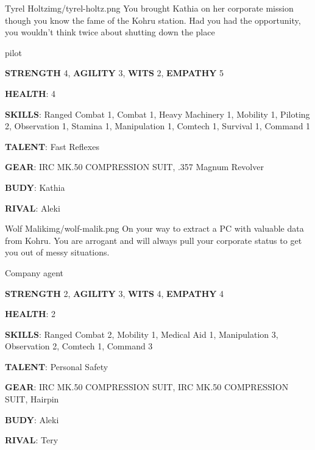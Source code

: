 \medskip \medskip \medskip \medskip \medskip \medskip \medskip \medskip \medskip \medskip \medskip \medskip 
\medskip \medskip \medskip \medskip \medskip \medskip \medskip \medskip \medskip \medskip \medskip \medskip 




\begin{rpg-pcbox}{Tyrel Holtz}{img/tyrel-holtz.png}
    You brought Kathia on her corporate mission though you know the fame of the Kohru station. Had you had the opportunity, you wouldn't think twice about shutting down the place
\end{rpg-pcbox}

\begin{rpg-commentbox}{}
    pilot

    \textbf{STRENGTH} 4, \textbf{AGILITY} 3, \textbf{WITS} 2, \textbf{EMPATHY} 5

    \textbf{HEALTH}: 4

    \textbf{SKILLS}: Ranged Combat 1, Combat 1, Heavy Machinery 1, Mobility 1, Piloting 2, Observation 1, Stamina 1, Manipulation 1, Comtech 1, Survival 1, Command 1
    
    \textbf{TALENT}: Fast Reflexes
    
    \textbf{GEAR}: IRC MK.50 COMPRESSION SUIT, .357 Magnum Revolver

    \textbf{BUDY}: Kathia
    
    \textbf{RIVAL}: Aleki
\end{rpg-commentbox}


\newsect

\clearpage


\begin{rpg-pcbox}{Wolf Malik}{img/wolf-malik.png}
    On your way to extract a PC with valuable data from Kohru. 
    You are arrogant and will always pull your corporate status to get you out of messy situations.    
\end{rpg-pcbox}

\begin{rpg-commentbox}{}
    Company agent

    \textbf{STRENGTH} 2, \textbf{AGILITY} 3, \textbf{WITS} 4, \textbf{EMPATHY} 4

    \textbf{HEALTH}: 2

    \textbf{SKILLS}: Ranged Combat 2, Mobility 1, Medical Aid 1, Manipulation 3, Observation 2, Comtech 1, Command 3
    
    \textbf{TALENT}: Personal Safety
    
    \textbf{GEAR}: IRC MK.50 COMPRESSION SUIT, IRC MK.50 COMPRESSION SUIT, Hairpin

    \textbf{BUDY}: Aleki
    
    \textbf{RIVAL}: Tery
\end{rpg-commentbox}


